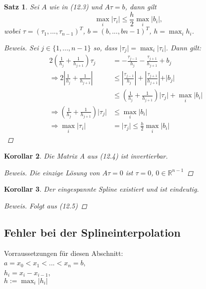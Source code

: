\documentclass[12pt]{article}
\theoremstyle{break}
\newtheorem{theorem}{Satz}[subsection]
\newtheorem{korollar}[theorem]{Korollar}
\begin{document}
\begin{theorem}
Sei $A$ wie in (12.3) und $A\tau = b$, dann gilt
$$\max_i \vert \tau_i \vert \leq \frac{h}{2} \max_i \vert b_i \vert,$$
wobei $\tau = (\tau_1, ..., \tau_{n-1})^T$, $b = (b, ..., b{n-1})^T$, $h = \max_i h_i$.

\begin{proof}[Beweis]
Sei $j \in \{1, ..., n-1\}$ so, dass $\vert \tau_j \vert = \max_i \vert \tau_i \vert$. Dann gilt:
\begin{align*}
2 \left( \frac{1}{h_j} + \frac{1}{h_{j+1}} \right) \tau_j &= -\frac{\tau_{j-1}}{h_j} -\frac{\tau_{j+1}}{h_{j+1}} + b_j &\\
\Rightarrow 2 \left\vert \frac{1}{h_j} + \frac{1}{h_{j+1}} \right\vert & \leq \left\vert \frac{\tau_{j-1}}{h_j} \right\vert + \left\vert \frac{\tau_{j+1}}{h_{j+1}} \right\vert + \vert b_j \vert &\\
& \leq \left( \frac{1}{h_j} + \frac{1}{h_{j+1}} \right) \vert \tau_j \vert + \max_i \vert b_i \vert &\\
\Rightarrow \left( \frac{1}{h_j} + \frac{1}{h_{j+1}} \right) \vert \tau_j \vert &\leq \max_i \vert b_i \vert &\\
\Rightarrow \max_i \vert \tau_i \vert &= \vert \tau_j \vert \leq \frac{h}{2} \max_i \vert b_i \vert 
\end{align*}
\end{proof}
\end{theorem}

\begin{korollar}
Die Matrix A aus (12.4) ist invertierbar.
\begin{proof}[Beweis]
Die einzige Lösung von $A\tau = 0$ ist $\tau = 0$, $0 \in \mathbb{R}^{n-1}$
\end{proof}
\end{korollar}

\begin{korollar}
Der eingespannte Spline existiert und ist eindeutig.
\begin{proof}[Beweis]
Folgt aus (12.5)
\end{proof}
\end{korollar}

\subsection{Fehler bei der Splineinterpolation}
Vorraussetzungen für diesen Abschnitt: \\
$a = x_0 < x_1 < ... < x_n = b$, \\
$h_i= x_i-x_{i-1}$, \\
$h:= \max_i \vert h_i \vert$
\end{document}
